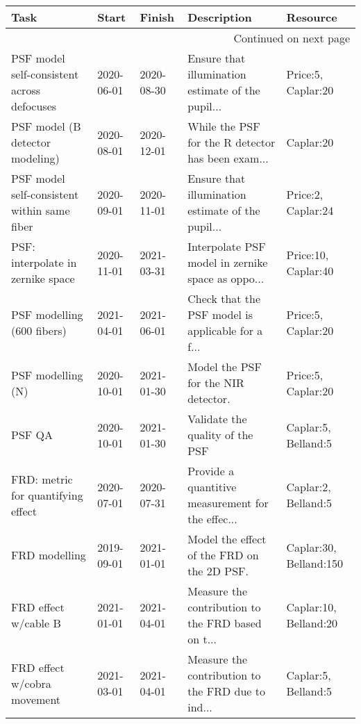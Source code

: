 \begin{longtable}{p{2cm}llp{2cm}l}
\toprule
                                        Task &       Start &      Finish &                                        Description &                      Resource \\
\midrule
\endhead
\midrule
\multicolumn{5}{r}{{Continued on next page}} \\
\midrule
\endfoot

\bottomrule
\endlastfoot
  PSF model self-consistent across defocuses &  2020-06-01 &  2020-08-30 &  Ensure that illumination estimate of the pupil... &            Price:5, Caplar:20 \\
             PSF model (B detector modeling) &  2020-08-01 &  2020-12-01 &  While the PSF for the R detector has been exam... &                     Caplar:20 \\
 PSF model self-consistent within same fiber &  2020-09-01 &  2020-11-01 &  Ensure that illumination estimate of the pupil... &            Price:2, Caplar:24 \\
           PSF: interpolate in zernike space &  2020-11-01 &  2021-03-31 &  Interpolate PSF model in zernike space as oppo... &           Price:10, Caplar:40 \\
                  PSF modelling (600 fibers) &  2021-04-01 &  2021-06-01 &  Check that the PSF model is applicable for a f... &            Price:5, Caplar:20 \\
                           PSF modelling (N) &  2020-10-01 &  2021-01-30 &                Model the PSF for the NIR detector. &            Price:5, Caplar:20 \\
                                      PSF QA &  2020-10-01 &  2021-01-30 &                    Validate the quality of the PSF &           Caplar:5, Belland:5 \\
          FRD: metric for quantifying effect &  2020-07-01 &  2020-07-31 &  Provide a quantitive measurement for the effec... &           Caplar:2, Belland:5 \\
                               FRD modelling &  2019-09-01 &  2021-01-01 &         Model the effect of the FRD on the 2D PSF. &        Caplar:30, Belland:150 \\
                        FRD effect w/cable B &  2021-01-01 &  2021-04-01 &  Measure the contribution to the FRD based on t... &         Caplar:10, Belland:20 \\
                 FRD effect w/cobra movement &  2021-03-01 &  2021-04-01 &  Measure the contribution to the FRD due to ind... &           Caplar:5, Belland:5 \\

\end{longtable}
